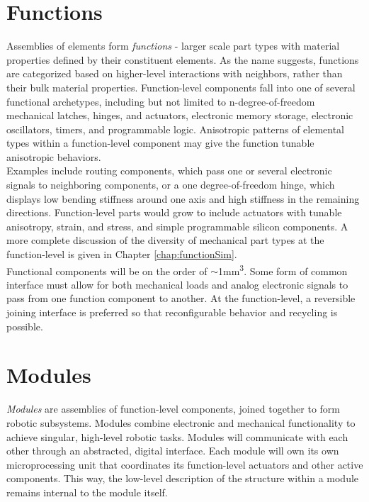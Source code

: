 {\section{Functions}

Assemblies of elements form \textit{functions} - larger scale part types with material properties defined by their constituent elements.  As the name suggests, functions are categorized based on higher-level interactions with neighbors, rather than their bulk material properties.  Function-level components fall into one of several functional archetypes, including but not limited to n-degree-of-freedom mechanical latches, hinges, and actuators, electronic memory storage, electronic oscillators, timers, and programmable logic.  Anisotropic patterns of elemental types within a function-level component may give the function tunable anisotropic behaviors.\\

Examples include routing components, which pass one or several electronic signals to neighboring components, or a one degree-of-freedom hinge, which displays low bending stiffness around one axis and high stiffness in the remaining directions.  Function-level parts would grow to include actuators with tunable anisotropy, strain, and stress, and simple programmable silicon components.  A more complete discussion of the diversity of mechanical part types at the function-level is given in Chapter \ref{chap:functionSim}.\\

Functional components will be on the order of $\sim$1mm\textsuperscript{3}.  Some form of common interface must allow for both mechanical loads and analog electronic signals to pass from one function component to another.  At the function-level, a reversible joining interface is preferred so that reconfigurable behavior and recycling is possible.

\section{Modules}

\textit{Modules} are assemblies of function-level components, joined together to form robotic subsystems.  Modules combine electronic and mechanical functionality to achieve singular, high-level robotic tasks.  Modules will communicate with each other through an abstracted, digital interface.  Each module will own its own microprocessing unit that coordinates its function-level actuators and other active components.  This way, the low-level description of the structure within a module remains internal to the module itself.\\

}
